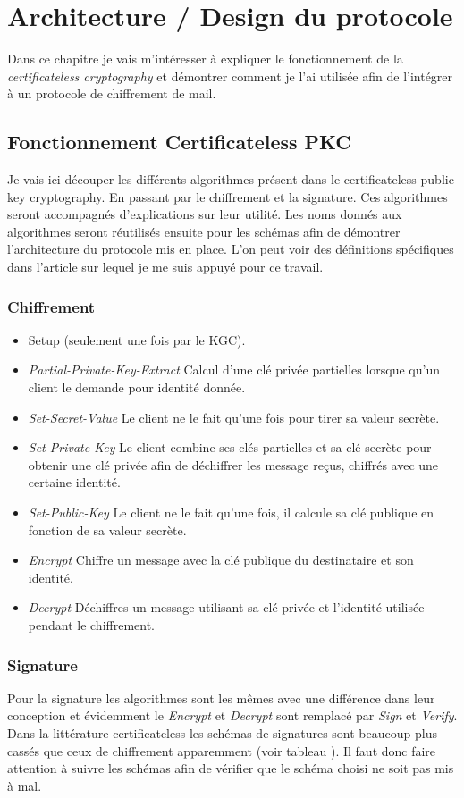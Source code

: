 \chapter{Architecture / Design du protocole}
\label{ch:arch}
Dans ce chapitre je vais m'intéresser à expliquer le fonctionnement de la \textit{certificateless cryptography} et démontrer comment je l'ai utilisée afin de l'intégrer à un protocole de chiffrement de mail.
\section{Fonctionnement Certificateless PKC}
Je vais ici découper les différents algorithmes présent dans le certificateless public key cryptography. En passant par le chiffrement et la signature.
Ces algorithmes seront accompagnés d'explications sur leur utilité. Les noms donnés aux algorithmes seront réutilisés ensuite pour les schémas afin de démontrer l'architecture du protocole mis en place. L'on peut voir des définitions spécifiques dans l'article sur lequel je me suis appuyé pour ce travail\cite{DBLP:conf/pkc/DentLP08}.
\subsection{Chiffrement}
\begin{itemize}
	\item Setup (seulement une fois par le KGC).
	\item \textit{Partial-Private-Key-Extract} Calcul d'une clé privée partielles lorsque qu'un client le demande pour identité donnée.
	\item \textit{Set-Secret-Value} Le client ne le fait qu'une fois pour tirer sa valeur secrète.
	\item \textit{Set-Private-Key} Le client combine ses clés partielles et sa clé secrète pour obtenir une clé privée afin de déchiffrer les message reçus, chiffrés avec une certaine identité.
	\item \textit{Set-Public-Key} Le client ne le fait qu'une fois, il calcule sa clé publique en fonction de sa valeur secrète.
	\item \textit{Encrypt} Chiffre un message avec la clé publique du destinataire et son identité.
	\item \textit{Decrypt} Déchiffres un message utilisant sa clé privée et l'identité utilisée pendant le chiffrement.
\end{itemize}
\subsection{Signature}
Pour la signature les algorithmes sont les mêmes avec une différence dans leur conception et évidemment le \textit{Encrypt} et \textit{Decrypt} sont remplacé par \textit{Sign} et \textit{Verify}.
Dans la littérature certificateless les schémas de signatures sont beaucoup plus cassés que ceux de chiffrement apparemment (voir tableau ). Il faut donc faire attention à suivre les schémas afin de vérifier que le schéma choisi ne soit pas mis à mal.
